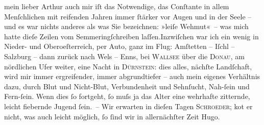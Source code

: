\pstart{}mein lieber Arthur\pend\vspace{0.5em}
\pstart
           auch mir iſt das Notwendige, das Conſtante in allem Menſchlichen mit reifenden Jahren
               immer{ }ſtärker vor Augen und in der Seele – und es war nichts anderes als was Sie
               bezeichnen: »leiſe Wehmut« – was mich hatte dieſe Zeilen vom Semmeringſchreiben laſſen.\hspace*{1.5em}Inzwiſchen war ich ein wenig in Nieder- und
                  Oberoeſterreich, {\pb}per Auto, ganz im Flug: Amſtetten – Iſchl – Salzburg – dann zurück nach Wels – Enns, bei \textsc{Wallsee} über die \textsc{Donau}, am nördlichen Ufer weiter, eine Nacht in \textsc{Dürnstein}: dies alles, nächſte Landſchaft, wird mir immer ergreifender, immer
               abgrundtiefer – auch mein eigenes Verhältnis dazu, durch Blut und Nicht-Blut,
               Verbundenheit und Sehnſucht, Nah-ſein und Fern-ſein. Wenn dies{ }ſo fortgeht,{ }ſo muſs
               ja das Alter eine wehrhafte zitternde, leicht fiebernde Jugend{ }ſein. – Wir erwarten
               in dieſen Tagen \textsc{Schroeder}; ko{\geminationm}t er nicht, was auch leicht möglich,{ }ſo{ }ſind
               wir in allernächſter Zeit \label{T_L02176-1v}\label{T_L02176-1}\pend
           \pstart \spacefill\mbox{Hugo.}\pend{}\endnumbering{}  \newcommand{\dateiname}{L02176}\newcommand{\titel}{Hugo von Hofmannsthal an Arthur Schnitzler, 16. 4. [1914]}\newcommand{\editorInnen}{Martin Anton Müller und Gerd-Hermann Susen}
